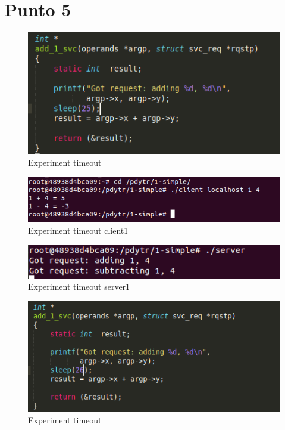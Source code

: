 \documentclass[12pt,journal,compsoc]{IEEEtran}
\begin{document}
\section{Punto 5}

\begin{figure}[H]
\centering
\includegraphics[width=125mm]{capturas/experiment-timeout25.png}
\caption{Experiment timeout}
\label{fig:experiment-timeout-25}
\end{figure}

\begin{figure}[H]
\centering
\includegraphics[width=125mm]{capturas/experiment-timeout25-client.png}
\caption{Experiment timeout client1}
\label{fig:experiment-timeout-25-client}
\end{figure}

\begin{figure}[H]
\centering
\includegraphics[width=125mm]{capturas/experiment-timeout25-server.png}
\caption{Experiment timeout server1}
\label{fig:experiment-timeout-25-server}
\end{figure}

\begin{figure}[H]
\centering
\includegraphics[width=125mm]{capturas/experiment-timeout26.png}
\caption{Experiment timeout}
\label{fig:experiment-timeout-26}
\end{figure}
\end{document}
